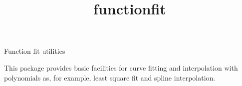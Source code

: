 \documentclass[12pt]{article}
\begin{document}
\begin{titlepage}
\title{functionfit}{Function fit utilities}

\vfill
This package provides basic facilities for curve fitting and interpolation
with polynomials as, for example, least square fit and spline interpolation.\\
\vfill
\end{titlepage}


\tableofcontents








\end{document}
